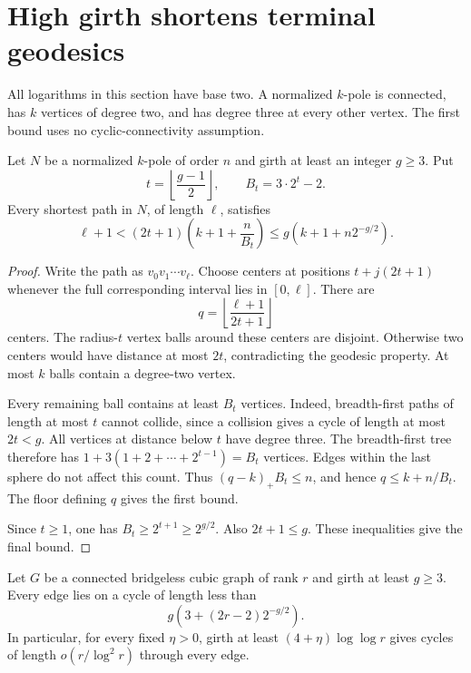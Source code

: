 \section{High girth shortens terminal geodesics}
\label{sec:four-high-connectivity-moore-paths}

All logarithms in this section have base two.
A normalized $k$-pole is connected, has $k$ vertices of degree two, and has degree three at every other vertex.
The first bound uses no cyclic-connectivity assumption.

\begin{lemma}
\label{lem:four-pole-moore-geodesic}
Let $N$ be a normalized $k$-pole of order $n$ and girth at least an integer $g\ge3$.
Put
\[
 t=\left\lfloor\frac{g-1}{2}\right\rfloor,
 \qquad B_t=3\cdot2^t-2.
\]
Every shortest path in $N$, of length $\ell$, satisfies
\begin{equation}\label{eq:four-moore-geodesic-exact}
 \ell+1<(2t+1)\left(k+1+\frac{n}{B_t}\right)
 \le g\left(k+1+n2^{-g/2}\right).
\end{equation}
\end{lemma}

\begin{proof}
Write the path as $v_0v_1\cdots v_\ell$.
Choose centers at positions $t+j(2t+1)$ whenever the full corresponding interval lies in $[0,\ell]$.
There are
\[
 q=\left\lfloor\frac{\ell+1}{2t+1}\right\rfloor
\]
centers.
The radius-$t$ vertex balls around these centers are disjoint.
Otherwise two centers would have distance at most $2t$, contradicting the geodesic property.
At most $k$ balls contain a degree-two vertex.

Every remaining ball contains at least $B_t$ vertices.
Indeed, breadth-first paths of length at most $t$ cannot collide, since a collision gives a cycle of length at most $2t<g$.
All vertices at distance below $t$ have degree three.
The breadth-first tree therefore has $1+3(1+2+\cdots+2^{t-1})=B_t$ vertices.
Edges within the last sphere do not affect this count.
Thus $(q-k)_+B_t\le n$, and hence $q\le k+n/B_t$.
The floor defining $q$ gives the first bound.

Since $t\ge1$, one has $B_t\ge2^{t+1}\ge2^{g/2}$.
Also $2t+1\le g$.
These inequalities give the final bound.
\end{proof}

\begin{corollary}
\label{cor:four-high-girth-edge-cycle}
Let $G$ be a connected bridgeless cubic graph of rank $r$ and girth at least $g\ge3$.
Every edge lies on a cycle of length less than
\[
 g\left(3+(2r-2)2^{-g/2}\right).
\]
In particular, for every fixed $\eta>0$, girth at least $(4+\eta)\log\log r$ gives cycles of length $o(r/\log^2r)$ through every edge.
\end{corollary}

